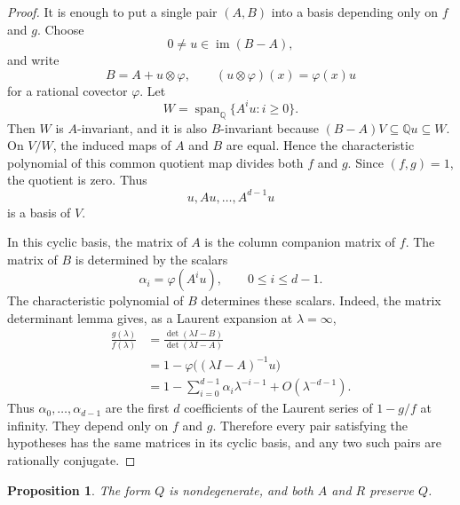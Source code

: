 \documentclass[a4paper,11pt]{amsart}
\newtheorem{proposition}[theorem]{Proposition}
\theoremstyle{remark}
\newcommand{\Q}{\mathbb Q}
\DeclareMathOperator{\im}{im}
\numberwithin{equation}{section}
\begin{document}
\begin{proof}
It is enough to put a single pair \((A,B)\) into a basis depending only on \(f\) and \(g\).  Choose
\[
        0\ne u\in\im(B-A),
\]
and write
\[
        B=A+u\otimes\varphi,
        \qquad
        (u\otimes\varphi)(x)=\varphi(x)u
\]
for a rational covector \(\varphi\).  Let
\[
        W=\operatorname{span}_{\Q}\{A^i u:i\ge0\}.
\]
Then \(W\) is \(A\)-invariant, and it is also \(B\)-invariant because \((B-A)V\subseteq \Q u\subseteq W\).  On \(V/W\), the induced maps of \(A\) and \(B\) are equal.  Hence the characteristic polynomial of this common quotient map divides both \(f\) and \(g\).  Since \((f,g)=1\), the quotient is zero.  Thus
\[
        u,Au,\ldots,A^{d-1}u
\]
is a basis of \(V\).

In this cyclic basis, the matrix of \(A\) is the column companion matrix of \(f\).  The matrix of \(B\) is determined by the scalars
\[
        \alpha_i=\varphi(A^i u),
        \qquad 0\le i\le d-1.
\]
The characteristic polynomial of \(B\) determines these scalars.  Indeed, the matrix determinant lemma gives, as a Laurent expansion at \(\lambda=\infty\),
\[
\begin{aligned}
        \frac{g(\lambda)}{f(\lambda)}
        &=
        \frac{\det(\lambda I-B)}{\det(\lambda I-A)}      \\
        &=1-\varphi\bigl((\lambda I-A)^{-1}u\bigr)       \\
        &=1-\sum_{i=0}^{d-1}\alpha_i\lambda^{-i-1}
          +O(\lambda^{-d-1}).
\end{aligned}
\]
Thus \(\alpha_0,\ldots,\alpha_{d-1}\) are the first \(d\) coefficients of the Laurent series of \(1-g/f\) at infinity.  They depend only on \(f\) and \(g\).  Therefore every pair satisfying the hypotheses has the same matrices in its cyclic basis, and any two such pairs are rationally conjugate.
\end{proof}

\begin{proposition}\label{prop:orthogonal-normal-form}
The form \(Q\) is nondegenerate, and both \(A\) and \(R\) preserve \(Q\).
\end{proposition}
\end{document}
